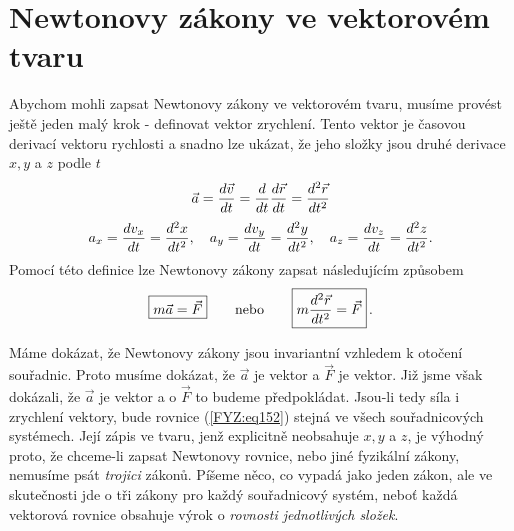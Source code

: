 {  \section{Newtonovy zákony ve vektorovém tvaru}
    Abychom mohli zapsat Newtonovy zákony ve vektorovém tvaru, musíme provést ještě jeden malý krok 
    - definovat vektor zrychlení. Tento vektor je časovou derivací vektoru rychlosti a snadno lze 
    ukázat, že jeho složky jsou druhé derivace \(x, y\) a \(z\) podle \(t\)
    \begin{equation}\label{FYZ:eq150}
      \vec{a} = \dfrac{d \vec{v}}{d t} = \dfrac{d  }{d t}\dfrac{d \vec{r}}{d t} = \dfrac{d^2 \vec{r}}{d t^2}
    \end{equation}
    \begin{equation*}                   %
      a_x = \der{v_x}{t} = \dder{x}{t}, \quad
      a_y = \der{v_y}{t} = \dder{y}{t}, \quad
      a_z = \der{v_z}{t} = \dder{z}{t}.
    \end{equation*}
     Pomocí této definice lze Newtonovy zákony zapsat následujícím způsobem
    \begin{equation}\label{FYZ:eq152}
      \boxed{m\vec{a} = \vec{F}} \qquad\text{nebo}\qquad  \boxed{m\dfrac{d^2 \vec{r}}{d t^2} = \vec{F}}\,.
    \end{equation}
     
     Máme dokázat, že Newtonovy zákony jsou invariantní vzhledem k otočení souřadnic. Proto musíme 
     dokázat, že \(\vec{a}\) je vektor a \(\vec{F}\) je vektor. Již jsme však dokázali, že 
     \(\vec{a}\) je vektor a o \(\vec{F}\) to budeme předpokládat. Jsou-li tedy síla i zrychlení 
     vektory, bude rovnice (\ref{FYZ:eq152}) stejná ve všech souřadnicových systémech. Její zápis 
     ve tvaru, jenž explicitně neobsahuje \(x, y\) a \(z\), je výhodný proto, že chceme-li zapsat 
     Newtonovy rovnice, nebo jiné fyzikální zákony, nemusíme psát \emph{trojici} zákonů. Píšeme 
     něco, co vypadá jako jeden zákon, ale ve skutečnosti jde o tři zákony pro každý souřadnicový 
     systém, neboť každá vektorová rovnice obsahuje výrok o \emph{rovnosti jednotlivých složek}. 
     
}

